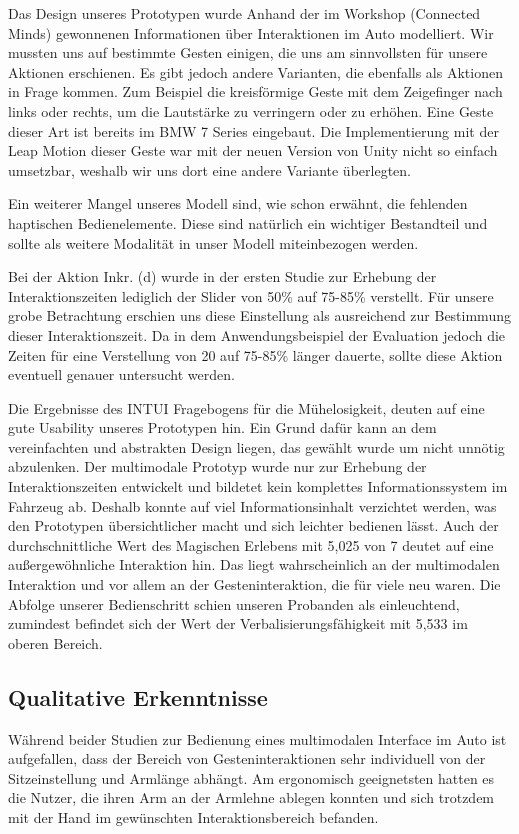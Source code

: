 Das Design unseres Prototypen wurde Anhand der im Workshop (Connected Minds) gewonnenen Informationen über Interaktionen im Auto modelliert. 
Wir mussten uns auf bestimmte Gesten einigen, die uns am sinnvollsten für unsere Aktionen erschienen. 
Es gibt jedoch andere Varianten, die ebenfalls als Aktionen in Frage kommen. 
Zum Beispiel die kreisförmige Geste mit dem Zeigefinger nach links oder rechts, um die Lautstärke zu verringern oder zu erhöhen. 
Eine Geste dieser Art ist bereits im BMW 7 Series eingebaut. 
Die Implementierung mit der Leap Motion dieser Geste war mit der neuen Version von Unity nicht so einfach umsetzbar, weshalb wir uns dort eine andere Variante überlegten.

Ein weiterer Mangel unseres Modell sind, wie schon erwähnt, die fehlenden haptischen Bedienelemente. 
Diese sind natürlich ein wichtiger Bestandteil und sollte als weitere Modalität in unser Modell miteinbezogen werden. 

Bei der Aktion Inkr. (d) wurde in der ersten Studie zur Erhebung der Interaktionszeiten lediglich der Slider von 50\% auf 75-85\% verstellt. Für unsere grobe Betrachtung erschien uns diese Einstellung als ausreichend zur Bestimmung dieser Interaktionszeit. 
Da in dem Anwendungsbeispiel der Evaluation jedoch die Zeiten für eine Verstellung von 20 auf 75-85\% länger dauerte, sollte diese Aktion eventuell genauer untersucht werden. 

Die Ergebnisse des INTUI Fragebogens für die Mühelosigkeit, deuten auf eine gute Usability unseres Prototypen hin. 
Ein Grund dafür kann an dem vereinfachten und abstrakten Design liegen, das gewählt wurde um nicht unnötig abzulenken.
Der multimodale Prototyp wurde nur zur Erhebung der Interaktionszeiten entwickelt und bildetet kein komplettes Informationssystem im Fahrzeug ab. 
Deshalb konnte auf viel Informationsinhalt verzichtet werden, was den Prototypen übersichtlicher macht und sich leichter bedienen lässt.
Auch der durchschnittliche Wert des Magischen Erlebens mit 5,025 von 7 deutet auf eine außergewöhnliche Interaktion hin. 
Das liegt wahrscheinlich an der multimodalen Interaktion und vor allem an der Gesteninteraktion, die für viele neu waren. 
Die Abfolge unserer Bedienschritt schien unseren Probanden als einleuchtend, zumindest befindet sich der Wert der Verbalisierungsfähigkeit mit 5,533 im oberen Bereich.

\subsection[Qualitative Erkenntnisse]{Qualitative Erkenntnisse}
Während beider Studien zur Bedienung eines multimodalen Interface im Auto ist aufgefallen, dass der Bereich von Gesteninteraktionen sehr individuell von der Sitzeinstellung und Armlänge abhängt. Am ergonomisch geeignetsten hatten es die Nutzer, die ihren Arm an der Armlehne ablegen konnten und sich trotzdem mit der Hand im gewünschten Interaktionsbereich befanden. 

